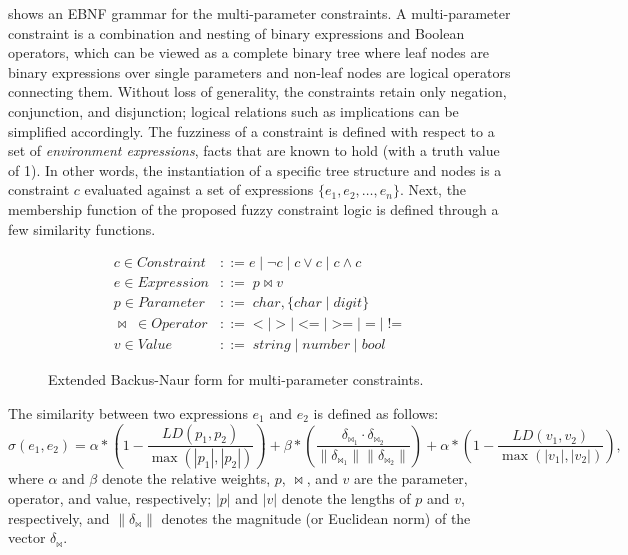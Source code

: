  shows an EBNF grammar for the multi-parameter constraints.
A multi-parameter constraint is a combination and nesting of binary expressions and Boolean
operators, which can be viewed as a complete binary tree where leaf nodes are binary expressions
over single parameters and non-leaf nodes are logical operators connecting them.
Without loss of generality, the constraints retain only negation, conjunction, and disjunction;
logical relations such as implications can be simplified accordingly.
The fuzziness of a constraint is defined with respect to a set of \emph{environment expressions},
facts that are known to hold (with a truth value of 1).
In other words, the instantiation of a specific tree structure and nodes is a constraint $c$
evaluated against a set of expressions $\{e_1, e_2, \ldots, e_n\}$.
Next, the membership function of the proposed fuzzy constraint logic is defined through a few similarity
functions.


\begin{figure}[t]
\small\centering
\begin{align*}
   c \in Constraint &::= e \; |\; \neg c \;|\; c \vee c \;|\; c \wedge c \nonumber\\
   e \in Expression &::= \; p \bowtie v\\
   p \in Parameter &::= \; char,\{char \;|\; digit\} \nonumber\\
   \bowtie \; \in Operator &::= \; \textbf{<} \;|\; \textbf{>} \;|\; \textbf{<=} \;|\;
   \textbf{>=} \;|\; \textbf{=} \;|\; \textbf{!=} \; \nonumber\\
   v \in Value &::= \; string \;|\; number \;|\; bool \nonumber
\end{align*}%
\caption{Extended Backus-Naur form for multi-parameter constraints.}\label{fig:ebnf}
\vspace{-5pt}
\end{figure}

\begin{definition}\label{def:es}
The similarity between two expressions $e_1$ and $e_2$ is defined as follows:
\begin{equation}\label{eq:simexpr}
  \sigma(e_1, e_2) = \alpha * (1 - \frac{LD(p_1, p_2)}{\max(|p_1|, |p_2|)}) + \beta *
  (\frac{\delta_{\bowtie_1} \cdot \delta_{\bowtie_2}}{\|\delta_{\bowtie_1}\|
  \|\delta_{\bowtie_2}\|}) + \alpha * (1 - \frac{LD(v_1, v_2)}{\max(|v_1|, |v_2|)}),
\end{equation}
where $\alpha$ and $\beta$ denote the relative weights, $p$, $\bowtie$, and $v$
are the parameter, operator, and value, respectively; $|p|$ and $|v|$ denote the lengths of $p$ and $v$, respectively, and $\|\delta_{\bowtie}\|$ denotes the magnitude (or Euclidean norm) of the vector $\delta_{\bowtie}$.
\end{definition}

